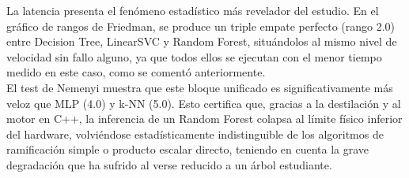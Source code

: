 \documentclass[a4paper,12pt,twoside,final]{book}
\begin{document}
La latencia presenta el fenómeno estadístico más revelador del estudio. En el gráfico de rangos de Friedman, se produce un
triple empate perfecto (rango 2.0) entre Decision Tree, LinearSVC y Random Forest, situándolos al mismo nivel de velocidad
sin fallo alguno, ya que todos ellos se ejecutan con el menor tiempo medido en este caso, como se comentó anteriormente.\\

El test de Nemenyi muestra que este bloque unificado es significativamente más veloz que MLP (4.0) y k-NN (5.0). Esto
certifica que, gracias a la destilación y al motor en C++, la inferencia de un Random Forest colapsa al límite físico
inferior del hardware, volviéndose estadísticamente indistinguible de los algoritmos de ramificación simple o producto
escalar directo, teniendo en cuenta la grave degradación que ha sufrido al verse reducido a un árbol estudiante.
\end{document}
